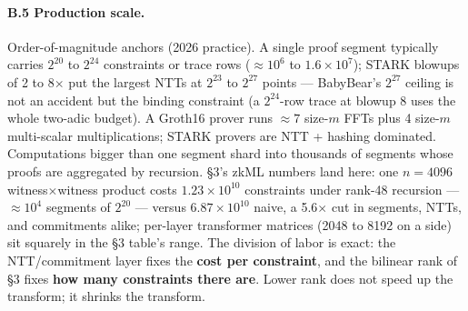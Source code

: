 \documentclass[10pt]{article}
\begin{document}
\paragraph{B.5 Production scale.} Order-of-magnitude anchors (2026
practice). A single proof segment typically carries
$2^{20}$ to $2^{24}$ constraints or trace rows
(${\approx}10^{6}$ to $1.6\times10^{7}$); STARK blowups of
2 to 8$\times$ put the largest NTTs at $2^{23}$ to $2^{27}$ points ---
BabyBear's $2^{27}$ ceiling is not an accident but the binding
constraint (a $2^{24}$-row trace at blowup 8 uses the whole
two-adic budget). A Groth16 prover runs ${\approx}7$ size-$m$ FFTs
plus 4 size-$m$ multi-scalar multiplications; STARK provers are NTT
+ hashing dominated. Computations bigger than one segment shard
into thousands of segments whose proofs are aggregated by
recursion. \S3's zkML numbers land here: one $n = 4096$
witness$\times$witness product costs $1.23\times10^{10}$
constraints under rank-48 recursion --- ${\approx}10^{4}$ segments
of $2^{20}$ --- versus $6.87\times10^{10}$ naive, a 5.6$\times$ cut
in segments, NTTs, and commitments alike; per-layer transformer
matrices (2048 to 8192 on a side) sit squarely in the \S3 table's
range. The division of labor is exact: the NTT/commitment layer
fixes the \textbf{cost per constraint}, and the bilinear rank of
\S3 fixes \textbf{how many constraints there are}. Lower rank does
not speed up the transform; it shrinks the transform.
\end{document}
